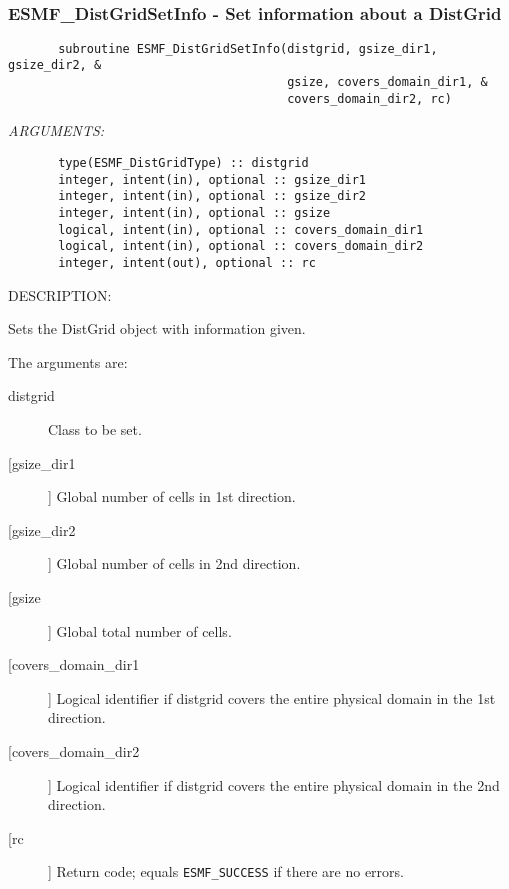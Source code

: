  
\mbox{}\hrulefill\ 
 
\subsubsection{ESMF\_DistGridSetInfo - Set information about a DistGrid}


 
\begin{verbatim}       subroutine ESMF_DistGridSetInfo(distgrid, gsize_dir1, gsize_dir2, &
                                       gsize, covers_domain_dir1, &
                                       covers_domain_dir2, rc)\end{verbatim}{\em ARGUMENTS:}
\begin{verbatim}       type(ESMF_DistGridType) :: distgrid
       integer, intent(in), optional :: gsize_dir1
       integer, intent(in), optional :: gsize_dir2
       integer, intent(in), optional :: gsize
       logical, intent(in), optional :: covers_domain_dir1
       logical, intent(in), optional :: covers_domain_dir2
       integer, intent(out), optional :: rc             
 \end{verbatim}
{\sf DESCRIPTION:\\ }


       Sets the DistGrid object with information given.
  
       The arguments are:
       \begin{description}
       \item[distgrid] 
            Class to be set.
       \item[[gsize\_dir1]]
            Global number of cells in 1st direction.
       \item[[gsize\_dir2]]
            Global number of cells in 2nd direction.
       \item[[gsize]]
            Global total number of cells.
       \item[[covers\_domain\_dir1]]
            Logical identifier if distgrid covers the entire physical domain
            in the 1st direction.
       \item[[covers\_domain\_dir2]]
            Logical identifier if distgrid covers the entire physical domain
            in the 2nd direction.
       \item[[rc]] 
            Return code; equals {\tt ESMF\_SUCCESS} if there are no errors.
       \end{description}
   
